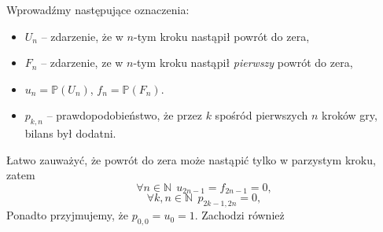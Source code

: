\documentclass[a4paper,11pt,twoside]{book}
\newcommand{\Prob}{\mathbb{P}}
\theoremstyle{definition}
\begin{document}
Wprowadźmy następujące oznaczenia:
\begin{itemize}
  \setlength\itemsep{1pt}
 \item $U_n$ -- zdarzenie, że w $n$-tym kroku nastąpił powrót do zera,
 \item $F_n$ -- zdarzenie, ze w $n$-tym kroku nastąpił \emph{pierwszy} powrót do zera,
 \item $u_n = \Prob(U_n)$, $f_n = \Prob(F_n)$.
 \item $p_{k,n}$ -- prawdopodobieństwo, że przez $k$ spośród pierwszych $n$ kroków gry, bilans był dodatni.
\end{itemize}
Łatwo zauważyć, że powrót do zera może nastąpić tylko w parzystym kroku, zatem
\[ \forall n \in \mathbb{N}\ \ u_{2n-1} = f_{2n-1} = 0, \]
\[ \forall k,n \in \mathbb{N}\ \ p_{2k-1, 2n} = 0, \]
Ponadto przyjmujemy, że $p_{0,0} = u_0 = 1$. Zachodzi również
\end{document}
